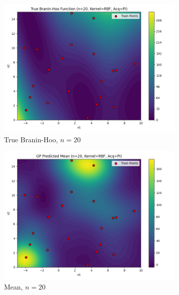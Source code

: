 \documentclass[a4paper,12pt]{article}
\begin{document}
\begin{figure}[H]
\begin{subfigure}{0.3\textwidth}
  \includegraphics[width=\linewidth]{Task-02/images/true_function_rbf_n20_PI.png}
  \caption{True Branin-Hoo, $n=20$}
\end{subfigure}
\begin{subfigure}{0.3\textwidth}
    \includegraphics[width=\linewidth]{Task-02/images/gp_mean_rbf_n20_PI.png}
    \caption{Mean, $n=20$}
\end{subfigure}
\begin{subfigure}{0.3\textwidth}

\end{subfigure}
\end{figure}
\end{document}
